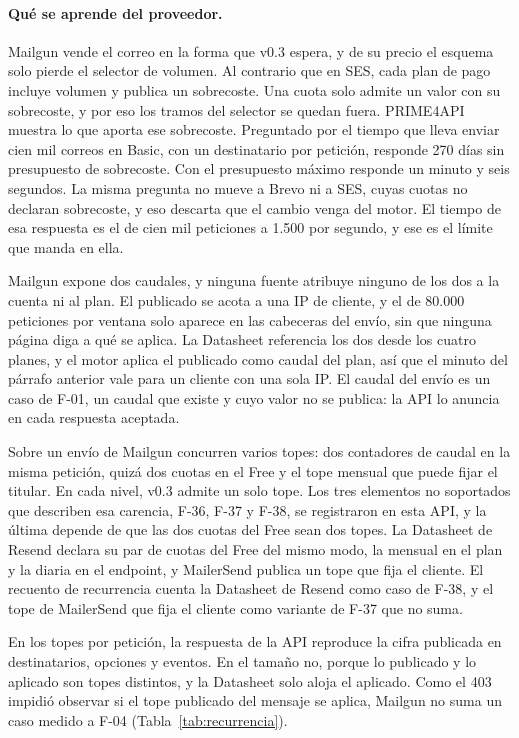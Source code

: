 \paragraph{Qué se aprende del proveedor.} Mailgun vende el correo en la forma que v0.3 espera, y de su precio el esquema solo pierde el selector de volumen. Al contrario que en SES, cada plan de pago incluye volumen y publica un sobrecoste. Una cuota solo admite un valor con su sobrecoste, y por eso los tramos del selector se quedan fuera. PRIME4API muestra lo que aporta ese sobrecoste. Preguntado por el tiempo que
lleva enviar cien mil correos en Basic, con un destinatario por petición,
responde 270 días sin presupuesto de sobrecoste. Con el presupuesto máximo
responde un minuto y seis segundos. La misma pregunta no mueve a Brevo ni a SES, cuyas
cuotas no declaran sobrecoste, y eso descarta que el cambio venga del motor. El
tiempo de esa respuesta es el de cien mil peticiones a 1.500 por segundo, y ese
es el límite que manda en ella.

Mailgun expone dos caudales, y ninguna fuente atribuye ninguno de los dos a la
cuenta ni al plan. El publicado se acota a una IP de cliente, y el de 80.000
peticiones por ventana solo aparece en las cabeceras del envío, sin que ninguna
página diga a qué se aplica. La Datasheet referencia los dos desde los cuatro
planes, y el motor aplica el publicado como caudal del plan, así que el minuto
del párrafo anterior vale para un cliente con una sola IP. El caudal del envío
es un caso de F-01, un caudal que existe y cuyo valor no se publica: la API lo
anuncia en cada respuesta aceptada.

Sobre un envío de Mailgun concurren varios topes: dos contadores de caudal en la misma petición, quizá dos cuotas en el Free y el tope mensual que puede fijar el titular. En cada nivel, v0.3 admite un solo tope. Los tres elementos no soportados que describen esa carencia, F-36, F-37 y F-38, se registraron en esta API, y la última depende de que las dos cuotas del Free sean dos topes. La Datasheet de Resend declara su par de cuotas del Free del mismo modo, la mensual en el plan y la diaria en el endpoint, y MailerSend publica un tope que fija el cliente. El recuento de recurrencia cuenta la Datasheet de Resend como caso de F-38, y el tope de MailerSend que fija el cliente como variante de F-37 que no suma.

En los topes por petición, la respuesta de la API reproduce la cifra publicada
en destinatarios, opciones y eventos. En el tamaño no, porque lo publicado y lo
aplicado son topes distintos, y la Datasheet solo aloja el aplicado. Como el 403
impidió observar si el tope publicado del mensaje se aplica, Mailgun no suma un caso medido a F-04 (Tabla~\ref{tab:recurrencia}).


